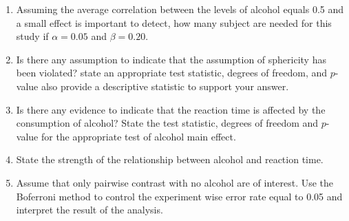 \begin{enumerate}
	\item Assuming the average correlation between the levels of alcohol equals 0.5 and a small effect is important to detect, how many subject are needed for this study if $\alpha = 0.05$ and $\beta = 0.20$.
	
  \item Is there any assumption to indicate that the assumption of sphericity has been violated? state an appropriate test statistic, degrees of freedom, and $p$-value also provide a descriptive statistic to support your answer.
	
	\item Is there any evidence to indicate that the reaction time is affected by the consumption of alcohol? State the test statistic, degrees of freedom and $p$-value for the appropriate test of alcohol main effect. 
	
	\item State the strength of the relationship between alcohol and reaction time.
	
	\item Assume that only pairwise contrast with no alcohol are of interest. Use the Boferroni method to control the experiment wise error rate equal to 0.05 and interpret the result of the analysis.
	
\end{enumerate}
  

